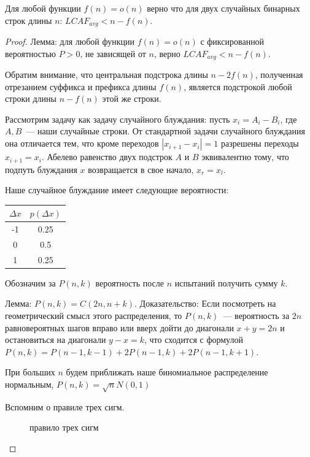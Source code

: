 \begin{theorem} %
Для любой функции $f(n)=o(n)$ верно что для двух случайных бинарных строк длины $n$: $LCAF_{avg} < n - f(n)$.
\end{theorem}
\begin{proof}

Лемма: для любой функции $f(n)=o(n)$ с фиксированной вероятностью $P>0$, не зависящей от $n$, верно $LCAF_{avg} < n - f(n)$.

Обратим внимание, что центральная подстрока длины $n-2f(n)$, полученная отрезанием суффикса и префикса длины $f(n)$, является подстрокой любой строки длины $n-f(n)$ этой же строки.

Рассмотрим задачу как задачу случайного блуждания: пусть $x_i = A_i - B_i$, где $A, B$~--- наши случайные строки. От стандартной задачи случайного блуждания она отличается тем, что кроме переходов $|x_{i+1}-x_i|=1$ разрешены переходы $x_{i+1}=x_i$. Абелево равенство двух подстрок $A$ и $B$ эквивалентно тому, что подпуть блуждания $x$ возвращается в свое начало, $x_r=x_l$.

Наше случайное блуждание имеет следующие вероятности:

\begin{tabular}{|c|c|}
\hline
$\Delta x$ & $p(\Delta x)$ \\
\hline
-1 & 0.25 \\
\hline
0 & 0.5 \\
\hline
1 & 0.25 \\
\hline
\end{tabular}

Обозначим за $P(n, k)$ вероятность после $n$ испытаний получить сумму $k$. 

Лемма: $P(n, k)=C(2n, n+k)$.
Доказательство:
Если посмотреть на геометрический смысл этого распределения, то $P(n,k)$~--- вероятность за $2n$ равновероятных шагов вправо или вверх дойти до диагонали $x+y=2n$ и остановиться на диагонали $y-x=k$, что сходится с формулой $P(n,k)=P(n-1,k-1)+2P(n-1,k)+2P(n-1,k+1)$.

При больших $n$ будем приближать наше биномиальное распределение нормальным, $P(n, k)=\sqrt {n} N(0,1)$ %

Вспомним о правиле трех сигм.

\begin{figure}[h]
\caption{правило трех сигм \cite{3}}
\end{figure}


\end{proof}
